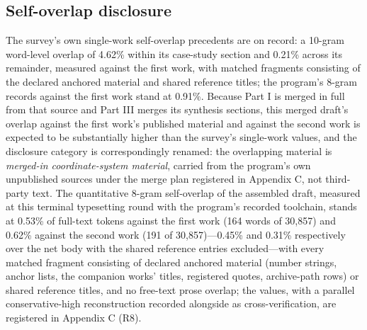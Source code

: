 \documentclass[11pt]{article}
\begin{document}
\subsection{Self-overlap disclosure}
\noindent The survey's own single-work self-overlap precedents are on record: a 10-gram word-level overlap of 4.62\% within its case-study section and 0.21\% across its remainder, measured against the first work, with matched fragments consisting of the declared anchored material and shared reference titles; the program's 8-gram records against the first work stand at 0.91\%. Because Part I is merged in full from that source and Part III merges its synthesis sections, this merged draft's overlap against the first work's published material and against the second work is expected to be substantially higher than the survey's single-work values, and the disclosure category is correspondingly renamed: the overlapping material is \emph{merged-in coordinate-system material}, carried from the program's own unpublished sources under the merge plan registered in Appendix C, not third-party text. The quantitative 8-gram self-overlap of the assembled draft, measured at this terminal typesetting round with the program's recorded toolchain, stands at 0.53\% of full-text tokens against the first work (164 words of 30,857) and 0.62\% against the second work (191 of 30,857)—0.45\% and 0.31\% respectively over the net body with the shared reference entries excluded—with every matched fragment consisting of declared anchored material (number strings, anchor lists, the companion works' titles, registered quotes, archive-path rows) or shared reference titles, and no free-text prose overlap; the values, with a parallel conservative-high reconstruction recorded alongside as cross-verification, are registered in Appendix C (R8).\par
\end{document}
